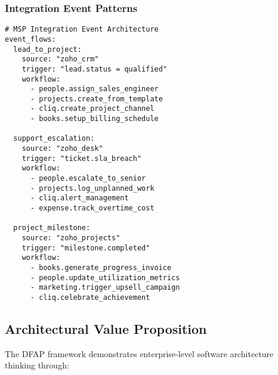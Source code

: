 \subsubsection{Integration Event Patterns}
\begin{verbatim}
# MSP Integration Event Architecture
event_flows:
  lead_to_project:
    source: "zoho_crm"
    trigger: "lead.status = qualified"
    workflow:
      - people.assign_sales_engineer
      - projects.create_from_template
      - cliq.create_project_channel
      - books.setup_billing_schedule
      
  support_escalation:
    source: "zoho_desk" 
    trigger: "ticket.sla_breach"
    workflow:
      - people.escalate_to_senior
      - projects.log_unplanned_work
      - cliq.alert_management
      - expense.track_overtime_cost
      
  project_milestone:
    source: "zoho_projects"
    trigger: "milestone.completed"
    workflow:
      - books.generate_progress_invoice
      - people.update_utilization_metrics
      - marketing.trigger_upsell_campaign
      - cliq.celebrate_achievement
\end{verbatim} 

\subsection{Architectural Value Proposition}

The DFAP framework demonstrates enterprise-level software architecture thinking through:

